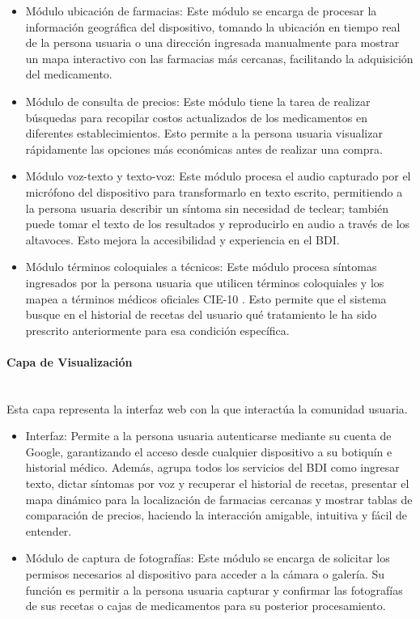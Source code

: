 \begin{itemize}
        \item Módulo ubicación de farmacias: Este módulo se encarga de procesar la información geográfica del dispositivo, tomando la ubicación en tiempo real de la persona usuaria o una dirección ingresada manualmente para mostrar un mapa interactivo con las farmacias más cercanas, facilitando la adquisición del medicamento.

        \item Módulo de consulta de precios: Este módulo tiene la tarea de realizar búsquedas para recopilar costos actualizados de los medicamentos en diferentes establecimientos. Esto permite a la persona usuaria visualizar rápidamente las opciones más económicas antes de realizar una compra.

        \item Módulo voz-texto y texto-voz: Este módulo procesa el audio capturado por el micrófono del dispositivo para transformarlo en texto escrito, permitiendo a la persona usuaria describir un síntoma sin necesidad de teclear; también puede tomar el texto de los resultados y reproducirlo en audio a través de los altavoces. Esto mejora la accesibilidad y experiencia en el BDI. 

        \item Módulo términos coloquiales a técnicos: Este módulo procesa síntomas ingresados por la persona usuaria que utilicen términos coloquiales y los mapea a términos médicos oficiales CIE-10 \cite{CIE10}. Esto permite que el sistema busque en el historial de recetas del usuario qué tratamiento le ha sido prescrito anteriormente para esa condición específica.   
    \end{itemize}
    
\paragraph{Capa de Visualización} \leavevmode \\
Esta capa representa la interfaz web con la que interactúa la comunidad usuaria.
\begin{itemize}
    \item Interfaz: Permite a la persona usuaria autenticarse mediante su cuenta de Google, garantizando el acceso desde cualquier dispositivo a su botiquín e historial médico. Además, agrupa todos los servicios del BDI como ingresar texto, dictar síntomas por voz y recuperar el historial de recetas, presentar el mapa dinámico para la localización de farmacias cercanas y mostrar tablas de comparación de precios, haciendo la interacción amigable, intuitiva y fácil de entender.
    \item Módulo de captura de fotografías: Este módulo se encarga de solicitar los permisos necesarios al dispositivo para acceder a la cámara o galería. Su función es permitir a la persona usuaria capturar y confirmar las fotografías de sus recetas o cajas de medicamentos para su posterior procesamiento.
\end{itemize}

